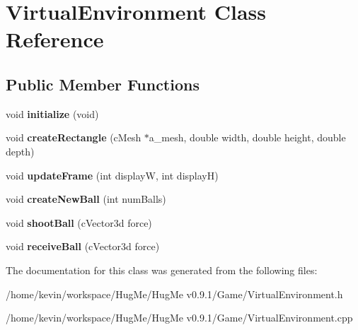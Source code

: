 \hypertarget{classVirtualEnvironment}{
\section{VirtualEnvironment Class Reference}
\label{classVirtualEnvironment}
}
\subsection*{Public Member Functions}
\begin{DoxyCompactItemize}
\item 
\hypertarget{classVirtualEnvironment_a8490579021c2abeef1dba404bab86db9}{
void {\bfseries initialize} (void)}
\label{classVirtualEnvironment_a8490579021c2abeef1dba404bab86db9}

\item 
\hypertarget{classVirtualEnvironment_a7043ae0cda7d3e88747b60398cd8d2af}{
void {\bfseries createRectangle} (cMesh $\ast$a\_\-mesh, double width, double height, double depth)}
\label{classVirtualEnvironment_a7043ae0cda7d3e88747b60398cd8d2af}

\item 
\hypertarget{classVirtualEnvironment_a0a8ed4924672f33fc870805c94b689f0}{
void {\bfseries updateFrame} (int displayW, int displayH)}
\label{classVirtualEnvironment_a0a8ed4924672f33fc870805c94b689f0}

\item 
\hypertarget{classVirtualEnvironment_a545b8b746ccf32946009f58d10a713cf}{
void {\bfseries createNewBall} (int numBalls)}
\label{classVirtualEnvironment_a545b8b746ccf32946009f58d10a713cf}

\item 
\hypertarget{classVirtualEnvironment_ac6e585d7da34668ea442fbebf3a88a38}{
void {\bfseries shootBall} (cVector3d force)}
\label{classVirtualEnvironment_ac6e585d7da34668ea442fbebf3a88a38}

\item 
\hypertarget{classVirtualEnvironment_a2dbea2896fb9a0f0730e7988202d286c}{
void {\bfseries receiveBall} (cVector3d force)}
\label{classVirtualEnvironment_a2dbea2896fb9a0f0730e7988202d286c}

\end{DoxyCompactItemize}


The documentation for this class was generated from the following files:\begin{DoxyCompactItemize}
\item 
/home/kevin/workspace/HugMe/HugMe v0.9.1/Game/VirtualEnvironment.h\item 
/home/kevin/workspace/HugMe/HugMe v0.9.1/Game/VirtualEnvironment.cpp\end{DoxyCompactItemize}
